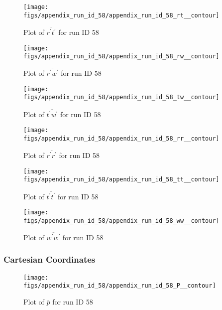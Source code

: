 \begin{figure}[H]
\centering
\texttt{[image: figs/appendix\_run\_id\_58/appendix\_run\_id\_58\_rt\_\_contour]}
\caption{Plot of $\overline{r^\prime t^\prime}$ for run ID 58}
\label{fig:appendix_run_id_58_rt__contour}
\end{figure}


\begin{figure}[H]
\centering
\texttt{[image: figs/appendix\_run\_id\_58/appendix\_run\_id\_58\_rw\_\_contour]}
\caption{Plot of $\overline{r^\prime w^\prime}$ for run ID 58}
\label{fig:appendix_run_id_58_rw__contour}
\end{figure}


\begin{figure}[H]
\centering
\texttt{[image: figs/appendix\_run\_id\_58/appendix\_run\_id\_58\_tw\_\_contour]}
\caption{Plot of $\overline{t^\prime w^\prime}$ for run ID 58}
\label{fig:appendix_run_id_58_tw__contour}
\end{figure}


\begin{figure}[H]
\centering
\texttt{[image: figs/appendix\_run\_id\_58/appendix\_run\_id\_58\_rr\_\_contour]}
\caption{Plot of $\overline{r^\prime r^\prime}$ for run ID 58}
\label{fig:appendix_run_id_58_rr__contour}
\end{figure}


\begin{figure}[H]
\centering
\texttt{[image: figs/appendix\_run\_id\_58/appendix\_run\_id\_58\_tt\_\_contour]}
\caption{Plot of $\overline{t^\prime t^\prime}$ for run ID 58}
\label{fig:appendix_run_id_58_tt__contour}
\end{figure}


\begin{figure}[H]
\centering
\texttt{[image: figs/appendix\_run\_id\_58/appendix\_run\_id\_58\_ww\_\_contour]}
\caption{Plot of $\overline{w^\prime w^\prime}$ for run ID 58}
\label{fig:appendix_run_id_58_ww__contour}
\end{figure}


\subsubsection{Cartesian Coordinates}
\begin{figure}[H]
\centering
\texttt{[image: figs/appendix\_run\_id\_58/appendix\_run\_id\_58\_P\_\_contour]}
\caption{Plot of $\overline{p}$ for run ID 58}
\label{fig:appendix_run_id_58_P__contour}
\end{figure}



